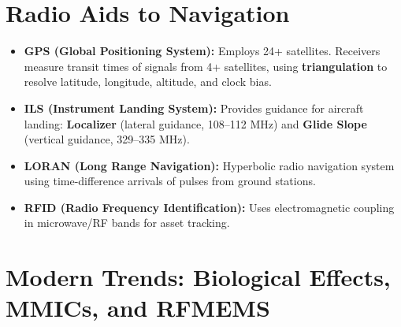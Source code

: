 \documentclass[12pt,a4paper]{article}
\begin{document}
\section{Radio Aids to Navigation}

\begin{itemize}[leftmargin=*, itemsep=3pt]
  \item \textbf{GPS (Global Positioning System):} Employs 24+ satellites. Receivers measure transit times of signals from 4+ satellites, using \textbf{triangulation} to resolve latitude, longitude, altitude, and clock bias.
  \item \textbf{ILS (Instrument Landing System):} Provides guidance for aircraft landing: \textbf{Localizer} (lateral guidance, 108--112 MHz) and \textbf{Glide Slope} (vertical guidance, 329--335 MHz).
  \item \textbf{LORAN (Long Range Navigation):} Hyperbolic radio navigation system using time-difference arrivals of pulses from ground stations.
  \item \textbf{RFID (Radio Frequency Identification):} Uses electromagnetic coupling in microwave/RF bands for asset tracking.
\end{itemize}

\section{Modern Trends: Biological Effects, MMICs, and RFMEMS}
\end{document}
